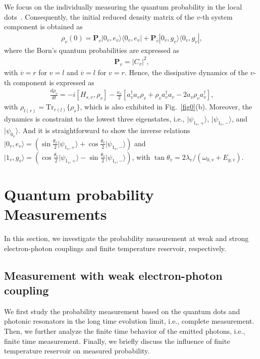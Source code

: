 \documentclass[twocolumn,showpacs,preprintnumbers,amsmath,amssymb]{revtex4}
\begin{document}
We focus on the individually measuring the quantum probability in the local dots~\cite{man2002book,jcorler2020prl}.
	Consequently, the initial reduced density matrix of the $v$-th system component is obtained as
	\begin{eqnarray}~\label{is2}
		\rho_{v}(0)=\mathbf{P}_v|0_v,e_{v}{\rangle}{\langle}0_v,e_{v}|
		+\mathbf{P}_{\overline{v}}|0_{v},g_{v}{\rangle}{\langle}0_{v},g_{v}|,
	\end{eqnarray}
where the Born's quantum probabilities are expressed as
\begin{eqnarray}~\label{bqp1}
\mathbf{P}_v=|C_v|^2,
\end{eqnarray}
with ${\overline{v}}={r}$ for $v={l}$ and  ${\overline{v}}={l}$ for $v={r}$.
	Hence, the dissipative dynamics of the $v$-th component is expressed as
	\begin{eqnarray}~\label{lindbladv}
		\frac{d \rho_v}{dt}=-i[H_{s,v},\rho_v]-\frac{\kappa_v}{2}[a^\dagger_v a_v \rho_v +\rho_v a^\dagger_v a_v -2a_v\rho_v a^\dagger_v],
	\end{eqnarray}
	with $\rho_{{l}({r})}
	=\textrm{Tr}_{{r}({l})}\{\rho_s\}$, which is also exhibited in Fig.~\ref{fig0}(b).
 	Moreover, the dynamics is constraint to the lowest three eigenstates,
	i.e.,
	$\vert \psi_{1_v,+}\rangle$, $\vert \psi_{1_v,-}\rangle$,
	and $|\psi_{0_v}{\rangle}$.
	And it is straightforward to show the inverse relations
	$|0_v,e_{v}{\rangle}=(\sin{\frac{\theta_v}{2}}\vert \psi_{1_v,+}\rangle +\cos{\frac{\theta_v}{2}}\vert \psi_{1_v,-} \rangle)$
	and
	$|1_v,g_{v}{\rangle}=(\cos{\frac{\theta_v}{2}}\vert \psi_{1_v,+}\rangle -\sin{\frac{\theta_v}{2}}\vert \psi_{1_v,-} \rangle)$,
	with $\tan{\theta_v}={2\lambda_v}/{(\omega_{0,v}+E_{g,v})}$.
	
	
	
	
	
	
	\section{Quantum probability Measurements}
	In this section, we investigate the probability measurement at weak and strong electron-photon couplings and finite temperature reservoir, respectively.
	
	\subsection{Measurement with weak electron-photon coupling}
	We first study the  probability measurement based on the quantum dots and  photonic resonators in the long time evolution limit,
	i.e., complete measurement.
	Then, we further analyze the finite time behavior of the emitted photons, i.e., finite time measurement.
	Finally, we briefly discuss the influence of finite temperature reservoir on measured probability.
	
\end{document}
